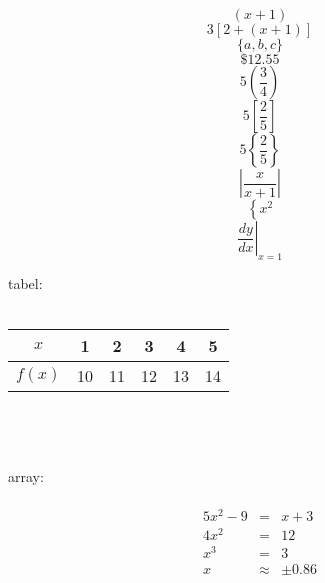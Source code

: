 \documentclass[11pt]{article}
\begin{document}
$$(x+1)$$
$$3[2+(x+1)]$$
$$\{a,b,c\}$$
$$\$12.55$$
$$5\left(\frac{3}{4}\right)$$
$$5\left[\frac{2}{5}\right]$$
$$5\left\{\frac{2}{5}\right\}$$
$$\left|\frac{x}{x+1}\right|$$
$$\left\{x^2\right.$$
$$\left.\frac{dy}{dx} \right|_{x=1}$$

tabel:
\\\\
\begin{tabular}{|c|c|c|c|c|c|}
\hline
$x$ & 1 & 2 & 3 & 4 & 5 \\ \hline
$f\left(x\right)$ & 10 & 11 & 12 & 13 & 14 \\
\hline
\end{tabular}
\\\\\\
array:\\\\
\begin{eqnarray}
5x^2-9&=&x+3\\
4x^2&=&12\\
x^3&=&3\\
x&\approx&\pm0.86
\end{eqnarray}
\end{document}
